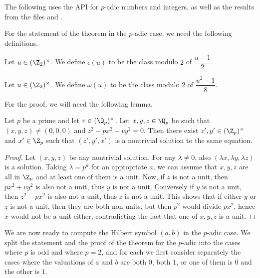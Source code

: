 The following uses the \mathlib API for $p$-adic numbers and integers, as well as the results from the files  and .


For the statement of the theorem in the $p$-adic case, we need the following definitions.


\begin{definition}
	\label{def:epsilon}
	\leanok
	Let $u \in (\Z_2)^\times$. We define $\epsilon(u)$ to be the class modulo $2$ of $\dfrac{u-1}{2}$.
\end{definition}

\begin{definition}
	\label{def:omega}
	\leanok
	Let $u \in (\Z_2)^\times$. We define $\omega(u)$ to be the class modulo $2$ of $\dfrac{u^2-1}{8}$.
\end{definition}



For the proof, we will need the following lemma.
\begin{lemma}
	\label{lem:nontrivialzero}
	\leanok
Let $p$ be a prime and let $v \in (\Q_p)^\times$. Let $x, y, z \in \Q_p$ be such that
$(x, y, z) \ne (0, 0, 0)$ and $z^2 - p x^2 - v y^2 = 0$. Then there exist
$z', y' \in (\Z_p)^\times$ and $x' \in \Z_p$ such that $(z', y', x')$ is a nontrivial solution to
the same equation.
\end{lemma}
\begin{proof}
	Let $(x,y,z)$ be any nontrivial solution. For any $\lambda \ne 0$, also $(\lambda x, \lambda y,
	\lambda z)$ is a solution. Taking $\lambda = p^a$ for an appropriate $a$, we can assume that
	$x,y,z$ are all in $\Z_p$ and at least one of them is a unit. Now, if $z$ is not a unit, then
	$px^2+vy^2$ is also not a unit, thus $y$ is not a unit. Conversely if $y$ is not a unit, then
	$z^2-px^2$ is also not a unit, thus $z$ is not a unit. This shows that if either $y$ or $z$ is not
	a unit, then they are both non units, but then $p^2$ would divide $px^2$, hence $x$ would not be a
	unit either, contradicting the fact that one of $x,y,z$ is a unit.
\end{proof}

We are now ready to compute the Hilbert symbol $(a,b)$ in the $p$-adic case.
We split the statement and the proof of the theorem for the $p$-adic into the cases where $p$ is odd
and where $p = 2$, and for each we first consider separately the cases where the valuations of $a$
and $b$ are both $0$, both $1$, or one of them is $0$ and the other is $1$.

